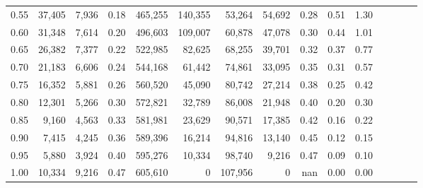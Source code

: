 \begin{tabular}{rrrcrrrrrrrrrrr}
0.55 &  37,405 &  7,936 &                                       0.18 &  465,255 &  140,355 &   53,264 &   54,692 &  0.28 &  0.51 &                         1.30 \\
0.60 &  31,348 &  7,614 &                                       0.20 &  496,603 &  109,007 &   60,878 &   47,078 &  0.30 &  0.44 &                         1.01 \\
0.65 &  26,382 &  7,377 &                                       0.22 &  522,985 &   82,625 &   68,255 &   39,701 &  0.32 &  0.37 &                         0.77 \\
0.70 &  21,183 &  6,606 &                                       0.24 &  544,168 &   61,442 &   74,861 &   33,095 &  0.35 &  0.31 &                         0.57 \\
0.75 &  16,352 &  5,881 &                                       0.26 &  560,520 &   45,090 &   80,742 &   27,214 &  0.38 &  0.25 &                         0.42 \\
0.80 &  12,301 &  5,266 &                                       0.30 &  572,821 &   32,789 &   86,008 &   21,948 &  0.40 &  0.20 &                         0.30 \\
0.85 &   9,160 &  4,563 &                                       0.33 &  581,981 &   23,629 &   90,571 &   17,385 &  0.42 &  0.16 &                         0.22 \\
0.90 &   7,415 &  4,245 &                                       0.36 &  589,396 &   16,214 &   94,816 &   13,140 &  0.45 &  0.12 &                         0.15 \\
0.95 &   5,880 &  3,924 &                                       0.40 &  595,276 &   10,334 &   98,740 &    9,216 &  0.47 &  0.09 &                         0.10 \\
1.00 &  10,334 &  9,216 &                                       0.47 &  605,610 &        0 &  107,956 &        0 &   nan &  0.00 &                         0.00 \\
\bottomrule
\end{tabular}
